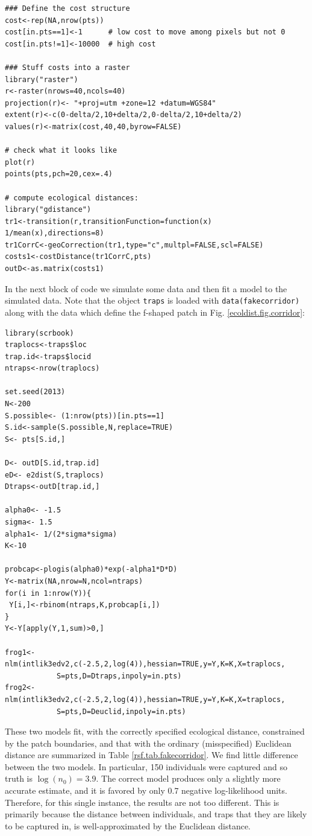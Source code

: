 {\small
\begin{verbatim}
### Define the cost structure
cost<-rep(NA,nrow(pts))
cost[in.pts==1]<-1      # low cost to move among pixels but not 0
cost[in.pts!=1]<-10000  # high cost

### Stuff costs into a raster
library("raster")
r<-raster(nrows=40,ncols=40)
projection(r)<- "+proj=utm +zone=12 +datum=WGS84"
extent(r)<-c(0-delta/2,10+delta/2,0-delta/2,10+delta/2)
values(r)<-matrix(cost,40,40,byrow=FALSE)

# check what it looks like
plot(r)
points(pts,pch=20,cex=.4)

# compute ecological distances:
library("gdistance")
tr1<-transition(r,transitionFunction=function(x) 1/mean(x),directions=8)
tr1CorrC<-geoCorrection(tr1,type="c",multpl=FALSE,scl=FALSE)
costs1<-costDistance(tr1CorrC,pts)
outD<-as.matrix(costs1)
\end{verbatim}
}

In the next block of code we simulate some data and then fit a model
to the simulated data.  Note that the object \mbox{\tt traps} is
loaded with \mbox{\tt data(fakecorridor)} along with the data which
define the f-shaped patch in 
Fig. \ref{ecoldist.fig.corridor}:
{\small
\begin{verbatim}
library(scrbook)
traplocs<-traps$loc
trap.id<-traps$locid
ntraps<-nrow(traplocs)

set.seed(2013)
N<-200
S.possible<- (1:nrow(pts))[in.pts==1]
S.id<-sample(S.possible,N,replace=TRUE)
S<- pts[S.id,]

D<- outD[S.id,trap.id]
eD<- e2dist(S,traplocs)
Dtraps<-outD[trap.id,]

alpha0<- -1.5
sigma<- 1.5
alpha1<- 1/(2*sigma*sigma)
K<-10

probcap<-plogis(alpha0)*exp(-alpha1*D*D)
Y<-matrix(NA,nrow=N,ncol=ntraps)
for(i in 1:nrow(Y)){
 Y[i,]<-rbinom(ntraps,K,probcap[i,])
}
Y<-Y[apply(Y,1,sum)>0,]

frog1<-nlm(intlik3edv2,c(-2.5,2,log(4)),hessian=TRUE,y=Y,K=K,X=traplocs,
            S=pts,D=Dtraps,inpoly=in.pts)
frog2<-nlm(intlik3edv2,c(-2.5,2,log(4)),hessian=TRUE,y=Y,K=K,X=traplocs,
            S=pts,D=Deuclid,inpoly=in.pts)
\end{verbatim}
}

These two models fit, with the correctly specified ecological
distance, constrained by the patch boundaries, and that with the
ordinary (misspecified) Euclidean distance are summarized in Table \ref{rsf.tab.fakecorridor}.
We find little difference between the two models. In
particular, 150 individuals were captured and so truth is $\log(n_{0}) = 3.9$.
The correct model produces only a slightly more accurate  estimate, and
it is favored by only 0.7 negative log-likelihood units.
Therefore, for this single instance, the results are not too different.
This is primarily because
 the distance between individuals, and traps that they are likely
to be captured in, is well-approximated by the Euclidean distance.


